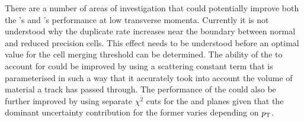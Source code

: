 There are a number of areas of investigation that could potentially improve both the \HT's and \KF's performance at low  transverse momenta.
Currently it is not understood why the duplicate rate increases near the boundary between normal and reduced precision \HT cells.
This effect needs to be understood before an optimal value for the cell merging threshold can be determined.
The ability of the \KF to account for \MS could be improved by using a scattering constant term that is parameterised in such a way that it accurately took into account the volume of material a track has passed through.
The performance of the \KF could also be further improved by using separate \KF $\chi^{2}$ cuts for the \rphi and \rz planes given that the dominant uncertainty contribution for the former varies depending on $p_{\mathrm{T}}$.